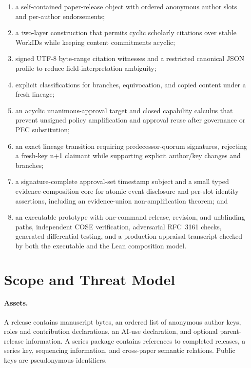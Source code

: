 \documentclass[11pt]{article}
\newcommand{\workid}{\textsf{WorkID}}
\begin{document}
\begin{enumerate}
  \item a self-contained paper-release object with ordered anonymous author slots and per-author endorsements;
  \item a two-layer construction that permits cyclic scholarly citations over stable \workid s while keeping content commitments acyclic;
  \item signed UTF-8 byte-range citation witnesses and a restricted canonical JSON profile to reduce field-interpretation ambiguity;
  \item explicit classifications for branches, equivocation, and copied content under a fresh lineage;
  \item an acyclic unanimous-approval target and closed capability calculus that prevent unsigned policy amplification and approval reuse after governance or PEC substitution;
  \item an exact lineage transition requiring predecessor-quorum signatures, rejecting a fresh-key n+1 claimant while supporting explicit author/key changes and branches;
  \item a signature-complete approval-set timestamp subject and a small typed
        evidence-composition core for atomic event disclosure and per-slot
        identity assertions, including an evidence-union non-amplification
        theorem; and
  \item an executable prototype with one-command release, revision, and
        unblinding paths, independent COSE verification, adversarial RFC~3161
        checks, generated differential testing, and a production appraisal
        transcript checked by both the executable and the Lean composition
        model.
\end{enumerate}

\section{Scope and Threat Model}

\paragraph{Assets.} A release contains manuscript bytes, an ordered list of anonymous author keys, roles and contribution declarations, an AI-use declaration, and optional parent-release information. A series package contains references to completed releases, a series key, sequencing information, and cross-paper semantic relations. Public keys are pseudonymous identifiers.
\end{document}
